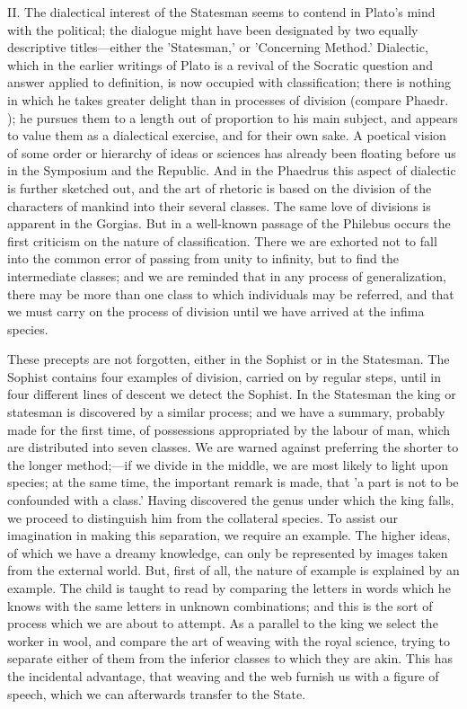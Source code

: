 \documentclass[11pt,letter]{article}
\begin{document}
\par  II. The dialectical interest of the Statesman seems to contend in Plato's mind with the political; the dialogue might have been designated by two equally descriptive titles—either the 'Statesman,' or 'Concerning Method.' Dialectic, which in the earlier writings of Plato is a revival of the Socratic question and answer applied to definition, is now occupied with classification; there is nothing in which he takes greater delight than in processes of division (compare Phaedr. ); he pursues them to a length out of proportion to his main subject, and appears to value them as a dialectical exercise, and for their own sake. A poetical vision of some order or hierarchy of ideas or sciences has already been floating before us in the Symposium and the Republic. And in the Phaedrus this aspect of dialectic is further sketched out, and the art of rhetoric is based on the division of the characters of mankind into their several classes. The same love of divisions is apparent in the Gorgias. But in a well-known passage of the Philebus occurs the first criticism on the nature of classification. There we are exhorted not to fall into the common error of passing from unity to infinity, but to find the intermediate classes; and we are reminded that in any process of generalization, there may be more than one class to which individuals may be referred, and that we must carry on the process of division until we have arrived at the infima species.

\par  These precepts are not forgotten, either in the Sophist or in the Statesman. The Sophist contains four examples of division, carried on by regular steps, until in four different lines of descent we detect the Sophist. In the Statesman the king or statesman is discovered by a similar process; and we have a summary, probably made for the first time, of possessions appropriated by the labour of man, which are distributed into seven classes. We are warned against preferring the shorter to the longer method;—if we divide in the middle, we are most likely to light upon species; at the same time, the important remark is made, that 'a part is not to be confounded with a class.' Having discovered the genus under which the king falls, we proceed to distinguish him from the collateral species. To assist our imagination in making this separation, we require an example. The higher ideas, of which we have a dreamy knowledge, can only be represented by images taken from the external world. But, first of all, the nature of example is explained by an example. The child is taught to read by comparing the letters in words which he knows with the same letters in unknown combinations; and this is the sort of process which we are about to attempt. As a parallel to the king we select the worker in wool, and compare the art of weaving with the royal science, trying to separate either of them from the inferior classes to which they are akin. This has the incidental advantage, that weaving and the web furnish us with a figure of speech, which we can afterwards transfer to the State.
\end{document}
